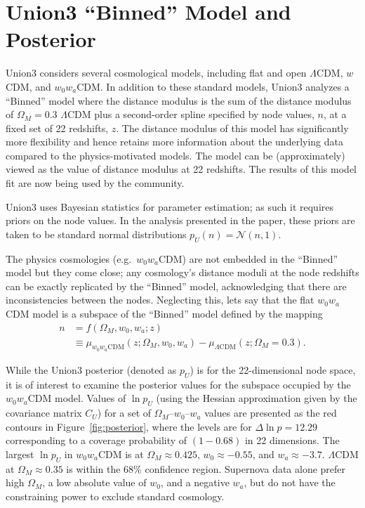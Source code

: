 \documentclass[11pt,a4paper]{article}
\begin{document}
\section{Union3 ``Binned'' Model and Posterior}
\label{sec:union3}
Union3 considers several cosmological models, including  flat and open $\Lambda$CDM, $w$CDM, and $w_0w_a$CDM.
In addition to these standard models,  Union3 analyzes a ``Binned'' model where the  distance modulus
is the sum of the distance modulus of $\Omega_M=0.3$  $\Lambda$CDM plus a second-order spline specified by node values, $n$,
at a fixed set of 22 redshifts, $z$.  The distance modulus of this model has significantly more flexibility 
and hence retains more information about the underlying data compared to the physics-motivated models.
The model can be (approximately) viewed as the value of distance modulus at 22 redshifts.
The results of this model fit are now being used by the community.

Union3 uses Bayesian statistics for parameter estimation; as such it requires 
priors on the node values. In the analysis presented in the paper, these priors are taken to be standard normal distributions
$p_U(n)=  \mathcal{N}(n,1)$.

The physics cosmologies (e.g.\ $w_0w_a$CDM)  are not embedded in the ``Binned'' model but 
they come close; any cosmology's distance moduli at the node redshifts can be exactly replicated by the ``Binned'' model, acknowledging that
there are
inconsistencies between the nodes.  Neglecting this, lets say that the flat $w_0w_a$CDM model
is a subspace of the ``Binned'' model defined by the mapping
\begin{align}
	n &= f(\Omega_M, w_0, w_a; z) \\
	& \equiv \mu_{w_0 w_a \text{CDM}}(z;\Omega_M, w_0, w_a)  - \mu_{\Lambda \text{CDM}}(z;\Omega_M=0.3).
\end{align}

While the Union3 posterior (denoted as $p_U$) is for the 22-dimensional node space, it is of interest to examine the posterior values for the
subspace occupied by the $w_0w_a$CDM
model. 
Values of $\ln{p_U}$ (using the Hessian approximation given by the covariance matrix $C_U$) for a
set of $\Omega_M$--$w_0$--$w_a$ values
 are presented as the red contours in Figure~\ref{fig:posterior}, where the levels are for  $\Delta \ln{p}=12.29$ corresponding to
a coverage probability of $(1-0.68)$ in 22 dimensions.
The largest $\ln{p_U}$ in $w_0w_a$CDM is at $\Omega_M\approx 0.425$, $w_0 \approx -0.55$, and $w_a \approx -3.7$. $\Lambda$CDM at $\Omega_M \approx 0.35$ is within the 68\% confidence region.
Supernova data alone prefer high $\Omega_M$, a low absolute value of $w_0$, and a negative $w_a$, but do not have
the constraining power to exclude standard cosmology.
\end{document}
